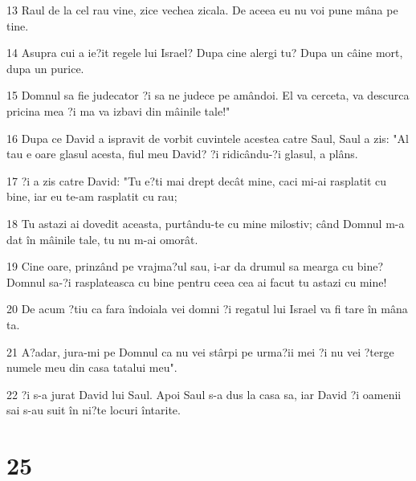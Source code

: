 \par 13 Raul de la cel rau vine, zice vechea zicala. De aceea eu nu voi pune mâna pe tine.
\par 14 Asupra cui a ie?it regele lui Israel? Dupa cine alergi tu? Dupa un câine mort, dupa un purice.
\par 15 Domnul sa fie judecator ?i sa ne judece pe amândoi. El va cerceta, va descurca pricina mea ?i ma va izbavi din mâinile tale!"
\par 16 Dupa ce David a ispravit de vorbit cuvintele acestea catre Saul, Saul a zis: "Al tau e oare glasul acesta, fiul meu David? ?i ridicându-?i glasul, a plâns.
\par 17 ?i a zis catre David: "Tu e?ti mai drept decât mine, caci mi-ai rasplatit cu bine, iar eu te-am rasplatit cu rau;
\par 18 Tu astazi ai dovedit aceasta, purtându-te cu mine milostiv; când Domnul m-a dat în mâinile tale, tu nu m-ai omorât.
\par 19 Cine oare, prinzând pe vrajma?ul sau, i-ar da drumul sa mearga cu bine? Domnul sa-?i rasplateasca cu bine pentru ceea cea ai facut tu astazi cu mine!
\par 20 De acum ?tiu ca fara îndoiala vei domni ?i regatul lui Israel va fi tare în mâna ta.
\par 21 A?adar, jura-mi pe Domnul ca nu vei stârpi pe urma?ii mei ?i nu vei ?terge numele meu din casa tatalui meu".
\par 22 ?i s-a jurat David lui Saul. Apoi Saul s-a dus la casa sa, iar David ?i oamenii sai s-au suit în ni?te locuri întarite.

\chapter{25}

